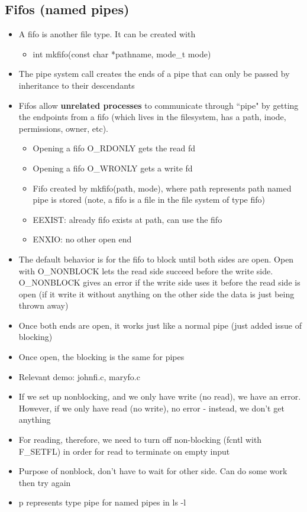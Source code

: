 \subsection{Fifos (named pipes)}
\begin{itemize}
    \item A fifo is another file type. It can be created with 
    \begin{itemize}
        \item int mkfifo(const char *pathname, mode\_t mode)
    \end{itemize}
    \item The pipe system call creates the ends of a pipe that can only be passed by inheritance to their descendants
    \item Fifos allow \textbf{unrelated processes} to communicate through ``pipe" by getting the endpoints from a fifo (which lives in the filesystem, has a path, inode, permissions, owner, etc).
    \begin{itemize}
        \item Opening a fifo O\_RDONLY gets the read fd
        \item Opening a fifo O\_WRONLY gets a write fd
        \item Fifo created by mkfifo(path, mode), where path represents path named pipe is stored (note, a fifo is a file in the file system of type fifo)
        \item EEXIST: already fifo exists at path, can use the fifo
        \item ENXIO: no other open end
    \end{itemize}
    \item The default behavior is for the fifo to block until both sides are open. Open with O\_NONBLOCK lets the read side succeed before the write side. O\_NONBLOCK gives an error if the write side uses it before the read side is open (if it write it without anything on the other side the data is just being thrown away)
    \item Once both ends are open, it works just like a normal pipe (just added issue of blocking)
    \item Once open, the blocking is the same for pipes
    \item Relevant demo: johnfi.c, maryfo.c
    \item If we set up nonblocking, and we only have write (no read), we have an error. However, if we only have read (no write), no error - instead, we don't get anything
    \item For reading, therefore, we need to turn off non-blocking (fcntl with F\_SETFL) in order for read to terminate on empty input
    \item Purpose of nonblock, don't have to wait for other side. Can do some work then try again
    \item p represents type pipe for named pipes in  ls -l
\end{itemize}
